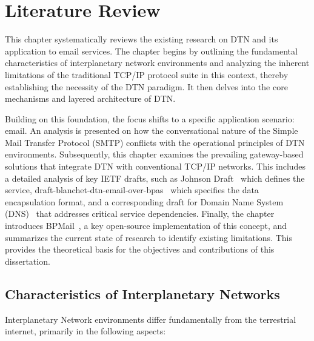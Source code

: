 \chapter{Literature Review}
This chapter systematically reviews the existing research on DTN and its application to email services. The chapter begins by outlining the fundamental characteristics of interplanetary network environments and analyzing the inherent limitations of the traditional TCP/IP protocol suite in this context, thereby establishing the necessity of the DTN paradigm. It then delves into the core mechanisms and layered architecture of DTN.

Building on this foundation, the focus shifts to a specific application scenario: email. An analysis is presented on how the conversational nature of the Simple Mail Transfer Protocol (SMTP) conflicts with the operational principles of DTN environments. Subsequently, this chapter examines the prevailing gateway-based solutions that integrate DTN with conventional TCP/IP networks. This includes a detailed analysis of key IETF drafts, such as Johnson Draft~\cite{draft-johnson-dtn-interplanetary-smtp} which defines the service, draft-blanchet-dtn-email-over-bpas~\cite{draft-blanchet-dtn-email-over-bp} which specifies the data encapsulation format, and a corresponding draft for Domain Name System (DNS)~\cite{draft-johnson-dtn-interplanetary-dns} that addresses critical service dependencies. Finally, the chapter introduces BPMail~\cite{bpmail}, a key open-source implementation of this concept, and summarizes the current state of research to identify existing limitations. This provides the theoretical basis for the objectives and contributions of this dissertation.

\section{Characteristics of Interplanetary Networks}
Interplanetary Network environments differ fundamentally from the terrestrial internet, primarily in the following aspects:


